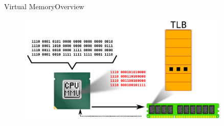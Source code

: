 \documentclass[10pt]{beamer}
\begin{document}
\begin{frame}{Virtual Memory}{Overview}
  \begin{figure}[ht]
    \centering
    \includegraphics[width=0.9\textwidth, keepaspectratio=true]{images/mmu_d.png}
  \end{figure}
\end{frame}


{\1
\begin{frame}
\end{frame}}
\end{document}
